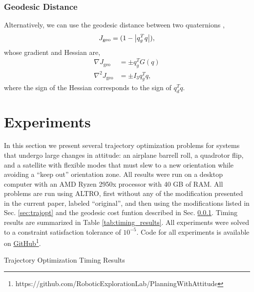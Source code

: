 \documentclass[letterpaper, 10 pt, conference]{ieeeconf}  %
\begin{document}
        \subsubsection{Geodesic Distance} \label{sec:geodesic}
            Alternatively, we can use the geodesic distance between two quaternions
            \cite{Kuffner2004},
            \begin{equation} \label{eq:quat_geodesic}
                J_\text{geo} = (1-\abs{q_g^T q}) ,
            \end{equation}
            whose gradient and Hessian are,
            \begin{align}
                \nabla J_\text{geo} &= \pm q_g^T G(q) \\
                \nabla^2 J_\text{geo} &= \pm I_3 q_g^T q ,
            \end{align}
            where the sign of the Hessian corresponds to the sign of $q_d^T q$.


\section{Experiments} \label{sec:experiments}
    In this section we present several trajectory optimization problems for systems that
    undergo large changes in attitude: an airplane barrell roll, a quadrotor flip, and a
    satellite with flexible modes that must slew to a new orientation while avoiding a 
    ``keep out'' orientation zone. All results were run on a desktop computer with an 
    AMD Ryzen 2950x processor with 40 GB of RAM. 
    All problems are run using ALTRO, first without any of the modification presented 
    in the current paper, labeled ``original'', and then using the modifications listed
    in Sec. \ref{sec:trajopt} and the geodesic cost funtion described in Sec. \ref{sec:geodesic}.
    Timing results are summarized in Table \ref{tab:timing_results}.
    All experiments were solved to a constraint satisfaction tolerance of $10^{-5}$.
    Code for all experiments is available on 
    \href{https://github.com/RoboticExplorationLab/PlanningWithAttitude}
    {GitHub\footnote{\url{https://github.com/RoboticExplorationLab/PlanningWithAttitude}}}.

    \begin{table}
        \centering
        
        \label{tab:timing_results}
        \caption{Trajectory Optimization Timing Results}
    \end{table}
        
\end{document}

